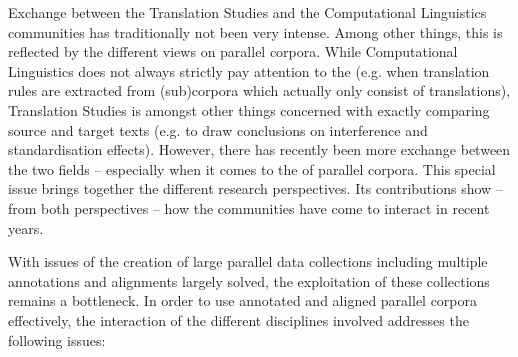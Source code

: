 \documentclass[output=paper]{LSP/langsci}
\begin{document}
Exchange between the Translation Studies and the Computational Linguistics communities has traditionally not been very intense. Among other things, this is reflected by the different views on parallel corpora. While Computational Linguistics does not always strictly pay attention to the  (e.g. when translation rules are extracted from (sub)corpora which actually only consist of translations), Translation Studies is amongst other things concerned with exactly comparing source and target texts (e.g. to draw conclusions on interference and standardisation effects). However, there has recently been more exchange between the two fields -- especially when it comes to the  of parallel corpora. This special issue brings together the different research perspectives. Its contributions show -- from both perspectives -- how the communities have come to interact in recent years.

With issues of the creation of large parallel data collections including multiple annotations and alignments largely solved, the exploitation of these collections remains a bottleneck. In order to use annotated and aligned parallel corpora effectively, the interaction of the different disciplines involved addresses the following issues:
\end{document}
